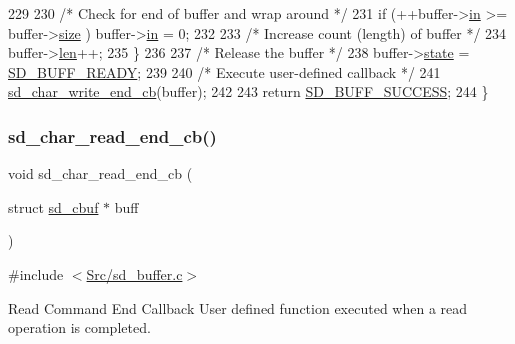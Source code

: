 \begin{DoxyCode}
229     
230         \textcolor{comment}{/* Check for end of buffer and wrap around */}
231         \textcolor{keywordflow}{if} (++buffer->\mbox{\hyperlink{structsd__cbuf_a86fd6c417fa43c58339f7cde29495419}{in}} >= buffer->\mbox{\hyperlink{structsd__cbuf_ab2c6b258f02add8fdf4cfc7c371dd772}{size}} ) buffer->\mbox{\hyperlink{structsd__cbuf_a86fd6c417fa43c58339f7cde29495419}{in}} = 0;
232     
233         \textcolor{comment}{/* Increase count (length) of buffer */}
234         buffer->\mbox{\hyperlink{structsd__cbuf_a96bbf959016e4411c9e6b9812a8be60a}{len}}++;
235     \}
236   
237     \textcolor{comment}{/* Release the buffer */}
238     buffer->\mbox{\hyperlink{structsd__cbuf_aa88ff4ca3b7aaba9e9aaa27fd9ea94a9}{state}} = \mbox{\hyperlink{group___s_d___buffer___types_gga52f14e9c7b7d9ba092e1cd615559012ba99d36bbc57255841b60f77f1a0059c7c}{SD\_BUFF\_READY}};
239   
240     \textcolor{comment}{/* Execute user-defined callback */}
241     \mbox{\hyperlink{group___s_d___buffer___functions_ga62eae3c0c1cbe53dbb549106668fa24c}{sd\_char\_write\_end\_cb}}(buffer);
242   
243     \textcolor{keywordflow}{return} \mbox{\hyperlink{group___s_d___buffer___types_gga012d8a07d989f00e3f9c4a2f62743de4a57815778d30aaa889a6e73dfc081e5f6}{SD\_BUFF\_SUCCESS}};
244 \}
\end{DoxyCode}
\mbox{\label{group___s_d___buffer___functions_ga17d8b9804dc4f2cbfbf03a5c23d227e7}} 
\subsubsection{\texorpdfstring{sd\+\_\+char\+\_\+read\+\_\+end\+\_\+cb()}{sd\_char\_read\_end\_cb()}}
{\footnotesize\ttfamily void sd\+\_\+char\+\_\+read\+\_\+end\+\_\+cb (\begin{DoxyParamCaption}\item[{struct \mbox{\hyperlink{structsd__cbuf}{sd\+\_\+cbuf}} $\ast$}]{buff }\end{DoxyParamCaption})}



{\ttfamily \#include $<$\mbox{\hyperlink{sd__buffer_8c}{Src/sd\+\_\+buffer.\+c}}$>$}



Read Command End Callback User defined function executed when a read operation is completed. 

